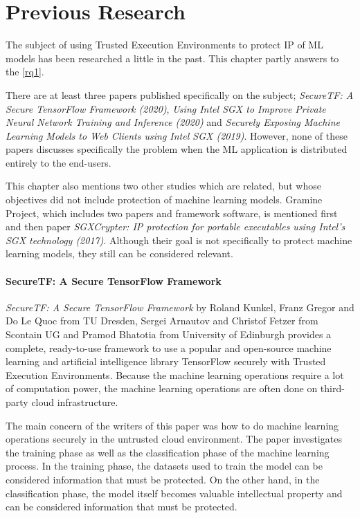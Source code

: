 \chapter{Previous Research} \label{prev-res}

The subject of using Trusted Execution Environments to protect IP of ML models has been researched a little in the past. This chapter partly answers to the \ref{rq1}.

There are at least three papers published specifically on the subject; \textit{SecureTF: A Secure TensorFlow Framework (2020)}\cite{securetf}, \textit{Using Intel SGX to Improve Private Neural Network Training and Inference (2020)}\cite{usingsgx} and \textit{Securely Exposing Machine Learning Models to Web Clients using Intel SGX (2019)\cite{securely}}. However, none of these papers discusses specifically the problem when the ML application is distributed entirely to the end-users.

This chapter also mentions two other studies which are related, but whose objectives did not include protection of machine learning models. Gramine Project\cite{gramine}, which includes two papers and framework software, is mentioned first and then paper \textit{SGXCrypter: IP protection for portable executables using Intel's SGX technology (2017)}\cite{sgxcrypter}. Although their goal is not specifically to protect machine learning models, they still can be considered relevant.

\subsubsection{SecureTF: A Secure TensorFlow Framework} \label{securetfa}

\textit{SecureTF: A Secure TensorFlow Framework} by Roland Kunkel, Franz Gregor and Do Le Quoc from TU Dresden, Sergei Arnautov and Christof Fetzer from Scontain UG and Pramod Bhatotia from University of Edinburgh provides a complete, ready-to-use framework to use a popular and open-source machine learning and artificial intelligence library TensorFlow securely with Trusted Execution Environments. Because the machine learning operations require a lot of computation power, the machine learning operations are often done on third-party cloud infrastructure.

The main concern of the writers of this paper was how to do machine learning operations securely in the untrusted cloud environment. The paper investigates the training phase as well as the classification phase of the machine learning process. In the training phase, the datasets used to train the model can be considered information that must be protected. On the other hand, in the classification phase, the model itself becomes valuable intellectual property and can be considered information that must be protected.


